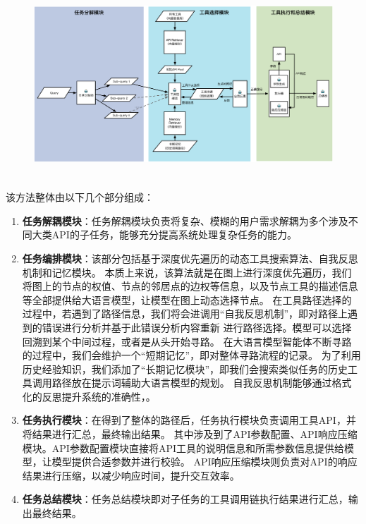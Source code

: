 \begin{figure}[!htp]
  \vspace{1em}
  \centering
  \setlength{\abovecaptionskip}{10pt} %
  \includegraphics[height=7cm]{../assets/ch4-整体框架图-3.pdf}
  \label{fig:ch4-framework}
\end{figure}

该方法整体由以下几个部分组成：

\begin{enumerate}
  \item \textbf{任务解耦模块}：任务解耦模块负责将复杂、模糊的用户需求解耦为多个涉及不同大类API的子任务，能够充分提高系统处理复杂任务的能力。
  \item \textbf{任务编排模块}：该部分包括基于深度优先遍历的动态工具搜索算法、自我反思机制和记忆模块。
  本质上来说，该算法就是在图上进行深度优先遍历，我们将图上的节点的权值、节点的邻居点的边权等信息，以及节点工具的描述信息等全部提供给大语言模型，让模型在图上动态选择节点。
  在工具路径选择的过程中，若遇到了路径信息，我们将会进调用“自我反思机制”，即对路径上遇到的错误进行分析并基于此错误分析内容重新
  进行路径选择。模型可以选择回溯到某个中间过程，或者是从头开始寻路。
  在大语言模型智能体不断寻路的过程中，我们会维护一个“短期记忆”，即对整体寻路流程的记录。
  为了利用历史经验知识，我们添加了“长期记忆模块”，即我们会搜索类似任务的历史工具调用路径放在提示词辅助大语言模型的规划。
  自我反思机制能够通过格式化的反思提升系统的准确性，。
  \item \textbf{任务执行模块}：在得到了整体的路径后，任务执行模块负责调用工具API，并将结果进行汇总，最终输出结果。
  其中涉及到了API参数配置、API响应压缩模块。API参数配置模块直接将API工具的说明信息和所需参数信息提供给模型，让模型提供合适参数并进行校验。
  API响应压缩模块则负责对API的响应结果进行压缩，以减少响应时间，提升交互效率。
  \item \textbf{任务总结模块}：任务总结模块即对子任务的工具调用链执行结果进行汇总，输出最终结果。
\end{enumerate}

